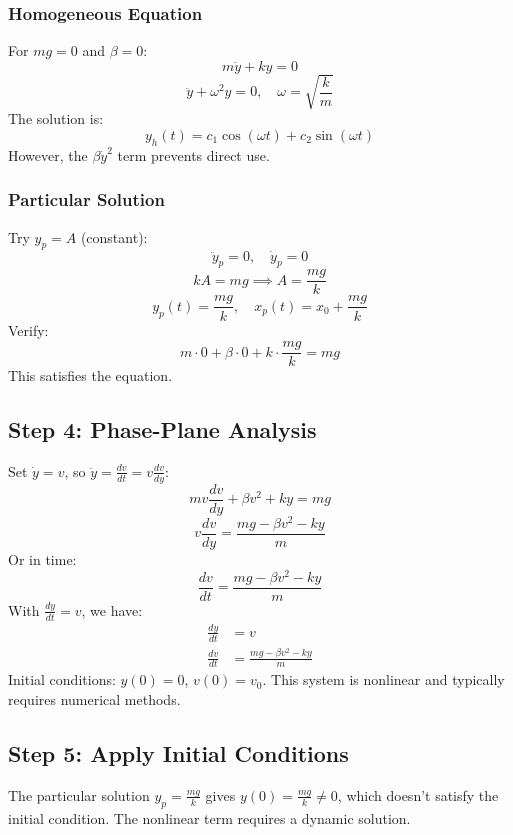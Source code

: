 \documentclass[a4paper,12pt]{article}
\begin{document}
\subsubsection*{Homogeneous Equation}
For \(mg = 0\) and \(\beta = 0\):
\begin{equation}
m \ddot{y} + k y = 0
\end{equation}
\[
\ddot{y} + \omega^2 y = 0, \quad \omega = \sqrt{\frac{k}{m}}
\]
The solution is:
\begin{equation}
y_h(t) = c_1 \cos(\omega t) + c_2 \sin(\omega t)
\end{equation}
However, the \(\beta \dot{y}^2\) term prevents direct use.

\subsubsection*{Particular Solution}
Try \(y_p = A\) (constant):
\[
\ddot{y}_p = 0, \quad \dot{y}_p = 0
\]
\[
k A = mg \implies A = \frac{mg}{k}
\]
\[
y_p(t) = \frac{mg}{k}, \quad x_p(t) = x_0 + \frac{mg}{k}
\]
Verify:
\[
m \cdot 0 + \beta \cdot 0 + k \cdot \frac{mg}{k} = mg
\]
This satisfies the equation.

\subsection*{Step 4: Phase-Plane Analysis}
Set \(\dot{y} = v\), so \(\ddot{y} = \frac{dv}{dt} = v \frac{dv}{dy}\):
\begin{equation}
m v \frac{dv}{dy} + \beta v^2 + k y = mg
\end{equation}
\[
v \frac{dv}{dy} = \frac{mg - \beta v^2 - k y}{m}
\]
Or in time:
\begin{equation}
\frac{dv}{dt} = \frac{mg - \beta v^2 - k y}{m}
\end{equation}
With \(\frac{dy}{dt} = v\), we have:
\begin{align}
\frac{dy}{dt} &= v \\
\frac{dv}{dt} &= \frac{mg - \beta v^2 - k y}{m}
\end{align}
Initial conditions: \(y(0) = 0\), \(v(0) = v_0\). This system is nonlinear and typically requires numerical methods.

\subsection*{Step 5: Apply Initial Conditions}
The particular solution \(y_p = \frac{mg}{k}\) gives \(y(0) = \frac{mg}{k} \neq 0\), which doesn’t satisfy the initial condition. The nonlinear term requires a dynamic solution.
\end{document}
